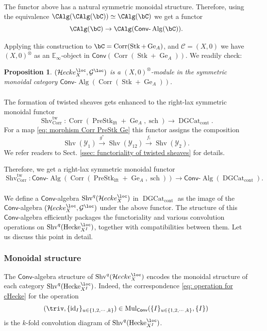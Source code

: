 \documentclass[10pt]{amsart}
\newcommand{\sssec}{\subsubsection}
\newtheorem{prop}[subsubsection]{Proposition}
\theoremstyle{remark}
\newcommand{\E}{\mathbb{E}}
\newcommand{\on}{\operatorname}
\newcommand{\cC}{\mathcal{C}}
\newcommand{\cG}{\mathcal{G}}
\newcommand{\cY}{\mathcal{Y}}
\newcommand{\DGcat}{\on{DGCat}_{\on{cont}}}
\newcommand{\lAlg}{\text{-}\on{Alg}}
\newcommand{\Shv}{\on{Shv}}
\newcommand{\PreStklft}{\on{PreStk}_{\on{lft}}}
\newcommand{\Stk}{\on{Stk}}
\newcommand{\id}{\on{id}}
\newcommand{\Hecke}{\on{Hecke}}
\newcommand{\Mul}{\on{Mul}}
\newcommand{\Conv}{\mathsf{Conv}}
\newcommand{\cHecke}{\mathcal{H}ecke}
\newcommand{\Corr}{\on{Corr}}
\begin{document}
The functor above has a natural symmetric monoidal structure. Therefore, using the equivalence $\CAlg(\CAlg(\bC))\simeq \CAlg(\bC)$ we get a functor
\begin{equation}\label{eq: CAlg to CAlg P Alg}
    \CAlg(\bC)\rightarrow \CAlg(\Conv\lAlg(\bC)).
\end{equation}

Applying this construction to $\bC=\Corr(\Stk+\on{Ge}_A)$, and $\cC=(X,0)$ we have $(X,0)^{\otimes}$ as an $\E_{\infty}$-object in $\Conv(\Corr(\Stk+\on{Ge}_A))$. We readily check:

\begin{prop}\label{prop: cHecke as an X module}
    $(\cHecke^{\loc}_X,\cG^{\loc})$ is a $(X,0)^{\otimes}$-module in the symmetric monoidal category $\Conv\lAlg(\Corr(\Stk+\on{Ge}_A))$.
\end{prop}



\sssec{}
The formation of twisted sheaves gets enhanced to the right-lax symmetric monoidal functor
\[\Shv^{\on{tw}}_{\on{Corr}}:\on{Corr}\left(\PreStklft+\on{Ge}_A, \on{sch}\right)\rightarrow \DGcat.\]
For a map \eqref{eq: morphism Corr PreStk Ge} this functor assigns the composition
\[\Shv(\cY_1)\xrightarrow{g^*} \Shv(\cY_{12})\xrightarrow{f_!}\Shv(\cY_2).\]
We refer readers to Sect. \ref{ssec: functoriality of twisted sheaves} for details.
\medskip

Therefore, we get a right-lax symmetric monoidal functor
\[\Shv^{\on{tw}}_{\on{Corr}}:\Conv\lAlg\left(\on{Corr}\left(\PreStklft+\on{Ge}_A, \on{sch}\right)\right)\rightarrow\Conv\lAlg(\DGcat).\]

\sssec{}
We define a $\Conv$-algebra $\Shv^q(\cHecke^{\loc}_X)$ in $\DGcat$ as the image of the $\Conv$-algebra $(\cHecke^{\loc}_X,\cG^{\loc})$ under the above functor. The structure of this $\Conv$-algebra efficiently packages the functoriality and various convolution operations on $\Shv^q(\Hecke^{\loc}_{X^I})$, together with compatibilities between them. Let us discuss this point in detail. 

\sssec{Monoidal structure}\label{sssec: ShvqHeckeloc monoidal str}
    The $\Conv$-algebra structure of $\Shv^q(\cHecke^{\loc}_X)$ encodes the monoidal structure of each category $\Shv^q(\Hecke^{\loc}_{X^I})$. Indeed, the correspondence \eqref{eq: operation for cHecke} for the operation \[(\triv, \{\id_I\}_{u\in \{1,2,\cdots,k\}})\in \Mul_{\Conv}(\{I\}_{u\in \{1,2,\cdots,k\}},\{I\})\]
    is the $k$-fold convolution diagram of $\Shv^q(\Hecke^{\loc}_{X^I})$.
    \medskip
\end{document}
